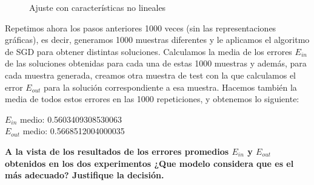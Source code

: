 \documentclass[a4]{article}
\begin{document}
\begin{figure}[H]
	\centering    
	\caption{Ajuste con características no lineales}
	\label{fig:nolin}
\end{figure}

Repetimos ahora los pasos anteriores 1000 veces (sin las representaciones gráficas), es decir, generamos 1000 muestras diferentes y le aplicamos el algoritmo de SGD para obtener distintas soluciones. Calculamos la media de los errores $E_{in}$ de las soluciones obtenidas para cada una de estas 1000 muestras y además, para cada muestra generada, creamos otra muestra de test con la que calculamos el error $E_{out}$ para la solución correspondiente a esa muestra. Hacemos también la media de todos estos errores en las 1000 repeticiones, y obtenemos lo siguiente:
\begin{center}
$ E_{in}$ medio: 0.5603409308530063 \\
$E_{out}$ medio: 0.5668512004000035 
\end{center}
\vspace{6mm}
\textbf{A la vista de los resultados de los errores promedios $ E_{in}$ y $E_{out}$ obtenidos en los dos
experimentos ¿Que modelo considera que es el más adecuado? Justifique la decisión.}
\end{document}
